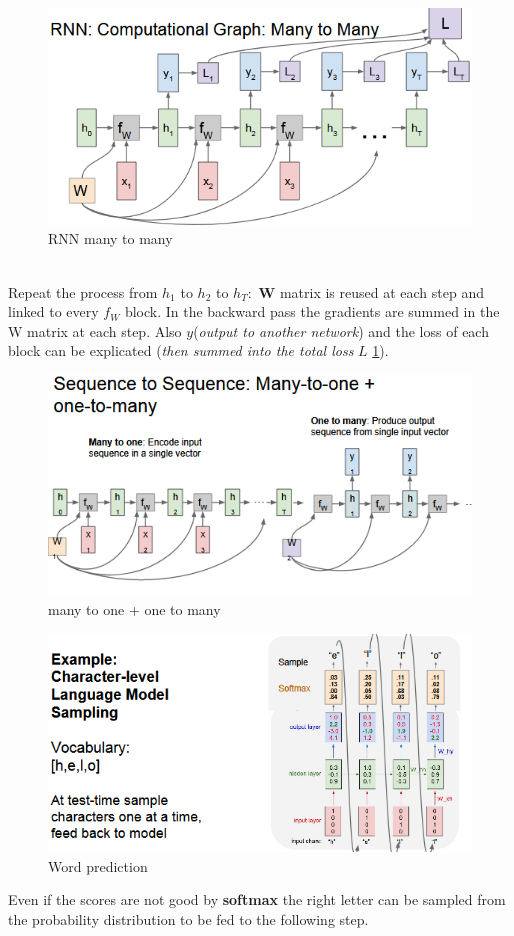 \documentclass[11pt]{article}
\begin{document}
\begin{figure}[h]
\centering
\captionsetup{justification=centering}
\includegraphics[width=0.8\linewidth]{L912.pdf}
\caption{ RNN many to many}
\label{fig:L912}
\end{figure}\\
Repeat the process from $h_1$ to $h_2$ to $h_T:$  $\mathbf{W} $ matrix is reused at each step and linked to every $f_W $ block. In the backward pass the gradients are summed  in the W matrix at each step. Also $y $(\textit{output to another network}) and the loss of each block can be explicated (\textit{then summed into the total loss} $L$ \ref{fig:L912}).
\begin{figure}[h]
\centering
\captionsetup{justification=centering}
\includegraphics[width=0.8\linewidth]{L913.pdf}
\caption{ many to one + one to many}
\label{fig:L913}
\end{figure}
\clearpage
\begin{figure}[h]
\centering
\captionsetup{justification=centering}
\includegraphics[width=0.8\linewidth]{L914.pdf}
\caption{ Word prediction}
\label{fig:L914}
\end{figure}
Even if the scores are not good by \textbf{softmax} the right letter can be sampled  from the probability distribution to be fed to the following step. 
\end{document}
